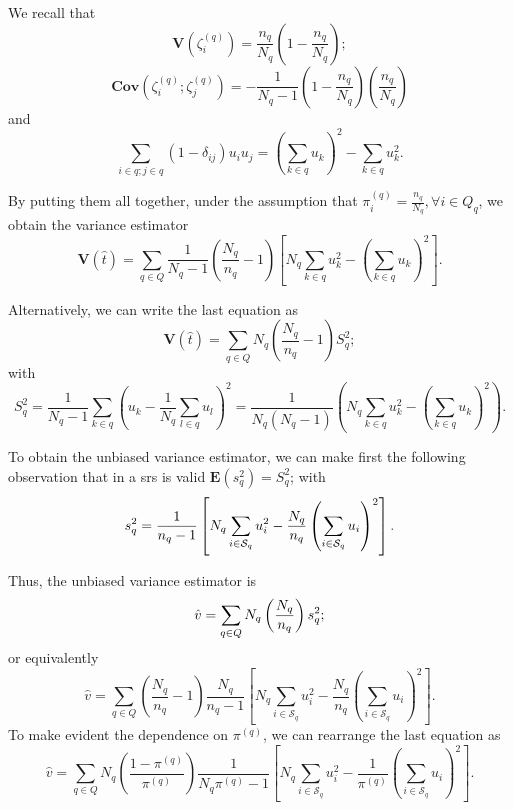 \begin{appendices}
We recall that
$$\mathbf{V}(\zeta^{(q)}_{i}) = \frac{n_q}{N_q}\left(1-\frac{n_q}{N_q}\right);$$
$$\mathbf{Cov}(\zeta^{(q)}_{i}; \zeta^{(q)}_{j}) = -\frac{1}{N_q-1}\left(1-\frac{n_{q}}{N_{q}}\right)\left(\frac{n_q}{N_q}\right)$$
and 
$$\sum_{i\in q; j \in q} (1-\delta_{ij})u_{i}u_{j} = \left(\sum_{k \in q} u_{k} \right)^{2} - \sum_{k \in q} u^{2}_{k}.$$

By putting them all together, under the assumption that $\pi^{(q)}_{i} = \frac{n_q}{N_q}, \forall i\in Q_{q}$, we obtain the variance estimator
\begin{equation}\label{eq:variance_mfs_estimator}
    \mathbf{V}(\hat{t}) = \sum_{q\in Q}\frac{1}{N_q-1}\left(\frac{N_q}{n_q}-1\right) \left[N_q \sum_{k \in q} u^{2}_{k} -  \left(\sum_{k \in q} u_{k} \right)^{2}\right]. 
\end{equation}

Alternatively, we can write the last equation as 
$$\mathbf{V}(\hat{t}) = \sum_{q\in Q} N_{q}\left(\frac{N_q}{n_q}-1 \right)S_{q}^{2};$$
with 
$$S_{q}^{2} = \frac{1}{N_q -1}\sum_{k \in q}\left( u_k - \frac{1}{N_q} \sum_{l \in q} u_l \right)^{2} =  \frac{1}{N_q(N_q-1)}\left(N_{q} \sum_{k \in q} u^{2}_{k}-\left(\sum_{k \in q}u_k\right)^{2}\right).$$

To obtain the unbiased variance estimator, we can make first the following observation that in a \gls{srs}
is valid $\mathbf{E}(s_{q}^{2}) = S_{q}^{2}$; with 
\begin{equation}\notag
     s_{q}^{2} = \frac{1}{n_q -1}\left[N_q\sum_{i\in \mathcal{S}_{q}} u_{i}^{2} -\frac{N_q}{n_q}\left(\sum_{i\in \mathcal{S}_{q}} u_{i}\right)^{2}\right].
\end{equation}

Thus, the unbiased variance estimator is
\begin{equation}\notag
    \hat{v} = \sum_{q \in Q} N_q\left(\frac{N_q}{n_q}\right) s_{q}^{2};
\end{equation}
or equivalently
\begin{equation}\label{eq:variance_estimator_apx}
    \hat{v} = \sum_{q \in Q} \left(\frac{N_q}{n_q}-1\right) \frac{N_q}{n_q -1}\left[N_q\sum_{i\in \mathcal{S}_{q}} u_{i}^{2} -\frac{N_q}{n_q}\left(\sum_{i\in \mathcal{S}_{q}} u_{i}\right)^{2}\right].
\end{equation}
To make evident the dependence on $\pi^{(q)}$, we can rearrange the last equation as
\begin{equation}\label{eq:variance_estimator_apx}
    \hat{v} = \sum_{q \in Q} N_{q}\left(\frac{1-\pi^{(q)}}{\pi^{(q)}}\right) \frac{1}{N_{q}\pi^{(q)} -1}\left[N_q\sum_{i\in \mathcal{S}_{q}} u_{i}^{2} -\frac{1}{\pi^{(q)}}\left(\sum_{i\in \mathcal{S}_{q}} u_{i}\right)^{2}\right].
\end{equation}


\end{appendices}
